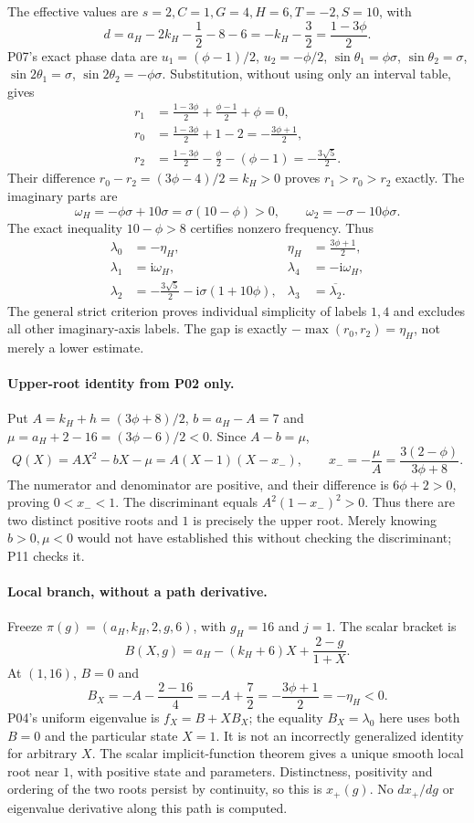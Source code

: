 \documentclass[11pt]{article}
\newcommand{\ii}{\mathrm i}
\begin{document}
The effective values are $s=2,C=1,G=4,H=6,T=-2,S=10$, with
\[
 d=a_H-2k_H-\frac12-8-6
   =-k_H-\frac32=\frac{1-3\phi}{2}.
\]
P07's exact phase data are $u_1=(\phi-1)/2$, $u_2=-\phi/2$,
$\sin\theta_1=\phi\sigma$, $\sin\theta_2=\sigma$,
$\sin2\theta_1=\sigma$, $\sin2\theta_2=-\phi\sigma$.
Substitution, without using only an interval table, gives
\begin{align*}
 r_1&=\frac{1-3\phi}{2}+\frac{\phi-1}{2}+\phi=0,\\
 r_0&=\frac{1-3\phi}{2}+1-2=-\frac{3\phi+1}{2},\\
 r_2&=\frac{1-3\phi}{2}-\frac\phi2-(\phi-1)
       =-\frac{3\sqrt5}{2}.
\end{align*}
Their difference $r_0-r_2=(3\phi-4)/2=k_H>0$ proves
$r_1>r_0>r_2$ exactly. The imaginary parts are
\[
 \omega_H=-\phi\sigma+10\sigma=\sigma(10-\phi)>0,
 \qquad\omega_2=-\sigma-10\phi\sigma.
\]
The exact inequality $10-\phi>8$ certifies nonzero frequency. Thus
\begin{align*}
 \lambda_0&=-\eta_H,&\eta_H&=\frac{3\phi+1}{2},\\
 \lambda_1&=\ii\omega_H,&\lambda_4&=-\ii\omega_H,\\
 \lambda_2&=-\frac{3\sqrt5}{2}-\ii\sigma(1+10\phi),
 &\lambda_3&=\overline{\lambda_2}.
\end{align*}
The general strict criterion proves individual simplicity of labels $1,4$
and excludes all other imaginary-axis labels. The gap is exactly
$-\max(r_0,r_2)=\eta_H$, not merely a lower estimate.

\paragraph{Upper-root identity from P02 only.}
Put $A=k_H+h=(3\phi+8)/2$, $b=a_H-A=7$ and
$\mu=a_H+2-16=(3\phi-6)/2<0$. Since $A-b=\mu$,
\[
 Q(X)=AX^2-bX-\mu=A(X-1)(X-x_-),\qquad
 x_-=-\frac\mu A=\frac{3(2-\phi)}{3\phi+8}.
\]
The numerator and denominator are positive, and their difference is
$6\phi+2>0$, proving $0<x_-<1$. The discriminant equals
$A^2(1-x_-)^2>0$. Thus there are two distinct positive roots and $1$
is precisely the upper root. Merely knowing $b>0,\mu<0$ would not
have established this without checking the discriminant; P11 checks it.

\paragraph{Local branch, without a path derivative.}
Freeze $\pi(g)=(a_H,k_H,2,g,6)$, with $g_H=16$ and $j=1$.
The scalar bracket is
\[
 B(X,g)=a_H-(k_H+6)X+\frac{2-g}{1+X}.
\]
At $(1,16)$, $B=0$ and
\[
 B_X=-A-\frac{2-16}{4}=-A+\frac72
      =-\frac{3\phi+1}{2}=-\eta_H<0.
\]
P04's uniform eigenvalue is $f_X=B+XB_X$; the equality
$B_X=\lambda_0$ here uses both $B=0$ and the particular state $X=1$.
It is not an incorrectly generalized identity for arbitrary $X$.
The scalar implicit-function theorem gives a unique smooth local root
near $1$, with positive state and parameters. Distinctness, positivity and
ordering of the two roots persist by continuity, so this is $x_+(g)$.
No $dx_+/dg$ or eigenvalue derivative along this path is computed.
\end{document}
